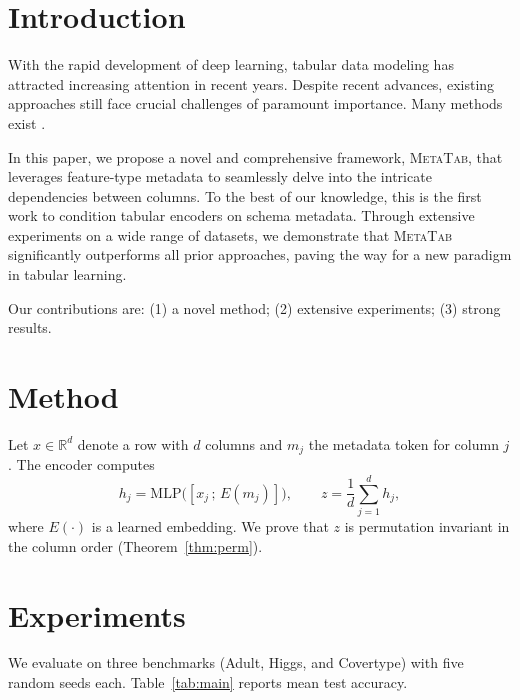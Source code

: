\section{Introduction}

With the rapid development of deep learning, tabular data modeling has attracted increasing attention in recent years. Despite recent advances, existing approaches still face crucial challenges of paramount importance. Many methods exist \citep{arik2021tabnet,gorishniy2021revisiting,huang2020tabtransformer,somepalli2021saint,chen2023trompt}.

In this paper, we propose a novel and comprehensive framework, \textsc{MetaTab}, that leverages feature-type metadata to seamlessly delve into the intricate dependencies between columns. To the best of our knowledge, this is the first work to condition tabular encoders on schema metadata. Through extensive experiments on a wide range of datasets, we demonstrate that \textsc{MetaTab} significantly outperforms all prior approaches, paving the way for a new paradigm in tabular learning.


Our contributions are: (1) a novel method; (2) extensive experiments; (3) strong results.

\section{Method}

Let $x \in \mathbb{R}^{d}$ denote a row with $d$ columns and $m_j$ the metadata token for column $j$. The encoder computes
\begin{equation}
  h_j = \mathrm{MLP}\big([x_j \,;\, E(m_j)]\big), \qquad z = \frac{1}{d}\sum_{j=1}^{d} h_j ,
  \label{eq:encoder}
\end{equation}
where $E(\cdot)$ is a learned embedding. We prove that $z$ is permutation invariant in the column order (Theorem~\ref{thm:perm}).

\section{Experiments}

We evaluate on three benchmarks (Adult, Higgs, and Covertype) with five random seeds each. Table~\ref{tab:main} reports mean test accuracy.

